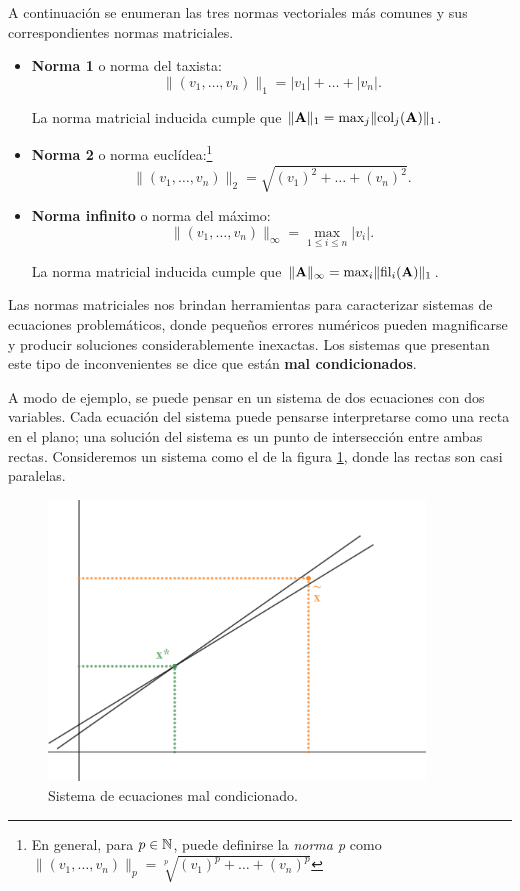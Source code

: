 A continuación se enumeran las tres normas vectoriales más comunes y sus
correspondientes normas matriciales.
\begin{itemize}
\item \textbf{Norma 1} o norma del taxista:
    \[ \lVert (v_1, \dots, v_n) \rVert_1
        = \lvert v_1 \rvert + \dots + \lvert v_n \rvert. \]

    La norma matricial inducida cumple que $\lVert \mathbf{A} \rVert_1
    = \max_{j} \lVert \operatorname{col}_j(\mathbf{A}) \rVert_1$.

\item \textbf{Norma 2} o norma euclídea:\footnote{En general,
    para $p \in \mathbb{N}$, puede definirse la \emph{norma p}
    como $\lVert (v_1, \dots, v_n) \rVert_p
    = \sqrt[p]{(v_1)^p + \dots + (v_n)^p}$}
    \[ \lVert (v_1, \dots, v_n) \rVert_2
        = \sqrt{(v_1)^2 + \dots + (v_n)^2}. \]

\item \textbf{Norma infinito} o norma del máximo:
    \[ \lVert (v_1, \dots, v_n) \rVert_\infty
        = \max_{1 \leq i \leq n} \lvert v_i \rvert. \]

    La norma matricial inducida cumple que $\lVert \mathbf{A} \rVert_\infty
    = \max_{i} \lVert \operatorname{fil}_i(\mathbf{A}) \rVert_1$.
\end{itemize}

Las normas matriciales nos brindan herramientas para caracterizar sistemas de
ecuaciones problemáticos, donde pequeños errores numéricos pueden magnificarse
y producir soluciones considerablemente inexactas. Los sistemas que presentan
este tipo de inconvenientes se dice que están \textbf{mal condicionados}.

A modo de ejemplo, se puede pensar en un sistema de dos ecuaciones con dos
variables. Cada ecuación del sistema puede pensarse interpretarse como una
recta en el plano; una solución del sistema es un punto de intersección
entre ambas rectas. Consideremos un sistema como el de la figura
\ref{fig:sist-mal-condicionado}, donde las rectas son casi paralelas.

\begin{figure}[H]
\centering
\includegraphics[width=10cm]{sist-mal-condicionado.png}
\caption{Sistema de ecuaciones mal condicionado.}
\label{fig:sist-mal-condicionado}
\end{figure}

